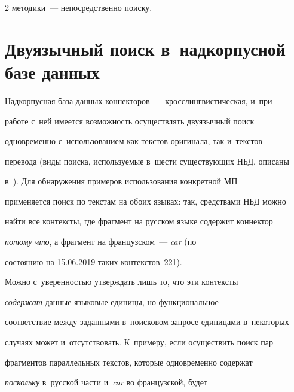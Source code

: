 \begin{multicols}{2}
методики~--- непосредственно поиску.





\vspace*{-9pt}





\section{Двуязычный поиск в~надкорпусной базе данных}





\vspace*{-4pt}





   


   Надкорпусная база данных коннекторов~--- кросслингвистическая, и~при 


работе с~ней имеется возможность осуществлять двуязычный поиск 


одновременно с~использованием как текстов оригинала, так и~текстов 


перевода (виды поиска, используемые в~шести существующих НБД, описаны 


в~\cite{14-in}). Для обнаружения примеров использования конкретной МП 


применяется поиск по текстам на обоих языках: так, средствами НБД можно 


\mbox{найти} все контексты, где фрагмент на русском языке содержит коннектор 


\textit{потому что}, а фрагмент на французском~--- \textit{car} (по 


состоянию на 15.06.2019 таких контекстов~221).


   


   Можно с~уверенностью утверждать лишь то, что эти контексты 


\textit{содержат} данные языковые единицы, но функциональное 


соответствие между заданными в~поисковом запросе единицами в~некоторых 


случаях может и~отсутствовать. К~примеру, если осуществить поиск пар 


фрагментов параллельных текстов, которые одновременно содержат 


\textit{поскольку} в~русской части и~\textit{car} во французской, будет 



\end{multicols}
